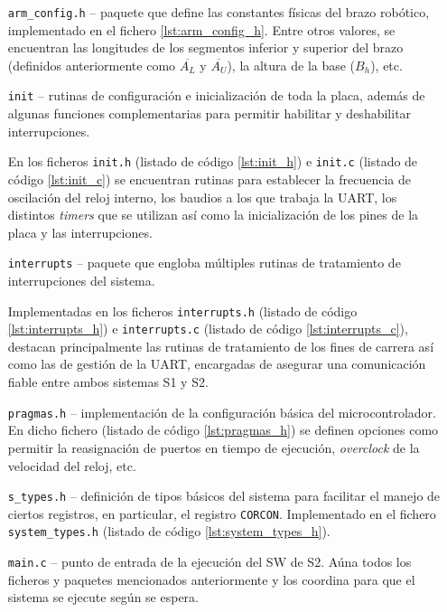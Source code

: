\begin{itemize}
    \item[\texttt{arm\_config.h} --] paquete que define las constantes físicas
    del brazo robótico, implementado en el fichero \ref{lst:arm_config_h}. Entre otros
    valores, se encuentran las longitudes de los segmentos inferior y superior del
    brazo (definidos anteriormente como $\overline{A_L}$ y $\overline{A_U}$),
    la altura de la base ($B_h$), etc.

    \item[\texttt{init} --] rutinas de configuración e inicialización de toda la
    placa, además de algunas funciones complementarias para permitir habilitar
    y deshabilitar interrupciones.

    En los ficheros \texttt{init.h} (listado de código \ref{lst:init_h}) e
    \texttt{init.c} (listado de código \ref{lst:init_c}) se encuentran rutinas para
    establecer la frecuencia de oscilación del reloj interno, los baudios a los
    que trabaja la \ac{UART}, los distintos \textit{timers} que se utilizan así como
    la inicialización de los pines de la placa y las interrupciones.

    \item[\texttt{interrupts} --] paquete que engloba múltiples rutinas de tratamiento
    de interrupciones del sistema.

    Implementadas en los ficheros \texttt{interrupts.h} 
    (listado de código \ref{lst:interrupts_h}) e \texttt{interrupts.c} (listado de
    código \ref{lst:interrupts_c}), destacan principalmente las rutinas de tratamiento
    de los fines de carrera así como las de gestión de la \ac{UART}, encargadas de
    asegurar una comunicación fiable entre ambos sistemas \ac{S1} y \ac{S2}.

    \item[\texttt{pragmas.h} --] implementación de la configuración básica del 
    microcontrolador. En dicho fichero (listado de código \ref{lst:pragmas_h}) se
    definen opciones como permitir la reasignación de puertos en tiempo de ejecución,
    \textit{overclock} de la velocidad del reloj, etc.

    \item[\texttt{s\_types.h} --] definición de tipos básicos del sistema
    para facilitar el manejo de ciertos registros, en particular, el registro
    \texttt{CORCON}. Implementado en el fichero \texttt{system\_types.h}
    (listado de código \ref{lst:system_types_h}).

    \item[\texttt{main.c} --] punto de entrada de la ejecución del \ac{SW} de
    \ac{S2}. Aúna todos los ficheros y paquetes mencionados anteriormente y los
    coordina para que el sistema se ejecute según se espera.


\end{itemize}
